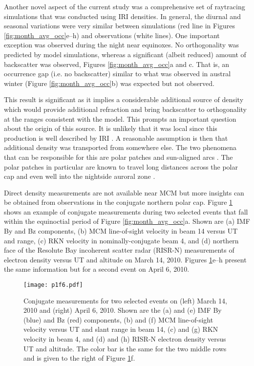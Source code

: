 Another novel aspect of the current study was a comprehensive set of raytracing simulations that was conducted using IRI densities. In general, the diurnal and seasonal variations were very similar between simulations (red line in Figures \ref{fig:month_avg_occ}e--h) and observations (white lines). One important exception was observed during the night near equinoxes. No orthogonality was predicted by model simulations, whereas a significant (albeit reduced) amount of backscatter was observed, Figures \ref{fig:month_avg_occ}a and c. That is, an occurrence gap (i.e. no backscatter) similar to what was observed in austral winter (Figure \ref{fig:month_avg_occ}b) was expected but not observed.



This result is significant as it implies a considerable additional source of density which would provide additional refraction and bring backscatter to orthogonality at the ranges consistent with the model. This prompts an important question about the origin of this source. It is unlikely that it was local since this production is well described by IRI \citep[e.g.][]{Themens2014}. A reasonable assumption is then that additional density was transported from somewhere else. The two phenomena that can be responsible for this are polar patches \citep{Weber1984} and sun-aligned arcs \citep{Valladares1994}. The polar patches in particular are known to travel long distances across the polar cap and even well into the nightside auroral zone \citep{Moen2007,Oksavik2010}.

Direct density measurements are not available near MCM but more insights can be obtained from observations in the conjugate northern polar cap. Figure \ref{fig:patchy_example} shows an example of conjugate measurements during two selected events that fall within the equinoctial period of Figure \ref{fig:month_avg_occ}a. Shown are (a) IMF By and Bz components, (b) MCM line-of-sight velocity in beam 14 versus UT and range, (c) RKN velocity in nominally-conjugate beam 4, and (d) northern face of the Resolute Bay incoherent scatter radar (RISR-N) measurements of electron density versus UT and altitude on March 14, 2010. Figures \ref{fig:patchy_example}e--h present the same information but for a second event on April 6, 2010.

\begin{figure}
\texttt{[image: p1f6.pdf]}
\caption{Conjugate measurements for two selected events on (left) March 14, 2010 and (right) April 6, 2010. Shown are the (a) and (e) IMF By (blue) and Bz (red) components, (b) and (f) MCM line-of-sight velocity versus UT and slant range in beam 14, (c) and (g) RKN velocity in beam 4, and (d) and (h) RISR-N electron density versus UT and altitude. The color bar is the same for the two middle rows and is given to the right of Figure \ref{fig:patchy_example}f.}
\label{fig:patchy_example}
\end{figure}

